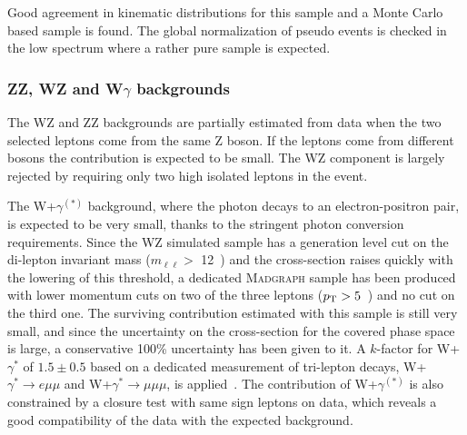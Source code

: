 Good agreement in kinematic distributions for this sample
and a Monte Carlo based \dytt sample is found.
The global normalization of pseudo \dytt events is 
checked in the low \mt spectrum where a rather pure
\dytt sample is expected.


	\subsubsection{ZZ, WZ and W\texorpdfstring{$\gamma$}{gamma} backgrounds\label{sec:otherbkg}}

The WZ and ZZ backgrounds are partially estimated from data when the two
selected leptons come from the same Z boson. If the leptons come from different
bosons the contribution is expected to be small. The WZ component is largely
rejected by requiring only two high \pt isolated leptons in the event. 

The W+$\gamma^{(*)}$ background, where the photon decays to an electron-positron pair,
is expected to be very small, thanks to the stringent photon conversion
requirements.
 Since the WZ simulated sample has a generation level cut on the
di-lepton invariant mass ($m_{\ell\ell} >$ 12~\GeV) and the cross-section raises
quickly with the lowering of this threshold, a dedicated \textsc{Madgraph} sample has
been produced with lower momentum cuts on two of the three leptons
($p_\mathrm{T} > 5$~\GeV) and no cut on the third one. The surviving contribution
estimated with this sample is still very small, and since the uncertainty on the
cross-section for the covered phase space is large, a conservative 100\%
uncertainty has been given to it. 
A $k$-factor for W+$\gamma^{*}$ of $1.5\pm0.5$ based on a dedicated measurement of 
tri-lepton decays, W+$\gamma^{*} \to e\mu\mu$ and W+$\gamma^{*} \to \mu\mu\mu$,
is applied~\cite{WGammaStarStudy}. 
The contribution of W+$\gamma^{(*)}$ is also
constrained by a closure test with same sign leptons on data, which reveals a
good compatibility of the data with the expected background.

